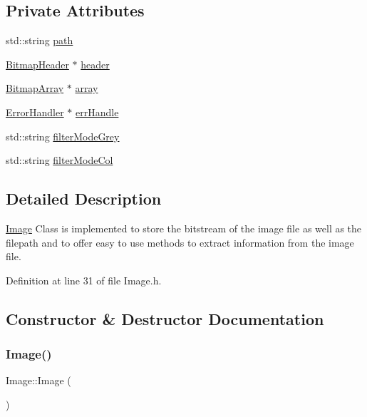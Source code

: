 \subsection*{Private Attributes}
\begin{DoxyCompactItemize}
\item 
std\+::string \mbox{\hyperlink{classImage_aec8a33f176362d146da8c058798ebbff}{path}}
\item 
\mbox{\hyperlink{classBitmapHeader}{Bitmap\+Header}} $\ast$ \mbox{\hyperlink{classImage_adaf72c2df8979eafb4031dc0384dc49f}{header}}
\item 
\mbox{\hyperlink{classBitmapArray}{Bitmap\+Array}} $\ast$ \mbox{\hyperlink{classImage_a1c18dd7d9eda416d44e7eb408d5b3c38}{array}}
\item 
\mbox{\hyperlink{classErrorHandler}{Error\+Handler}} $\ast$ \mbox{\hyperlink{classImage_a560753c20e67a544be57bba971021375}{err\+Handle}}
\item 
std\+::string \mbox{\hyperlink{classImage_aa05610d5ebee3b0fce0463d2a0b1323f}{filter\+Mode\+Grey}}
\item 
std\+::string \mbox{\hyperlink{classImage_a0b4e4d5994ff72c9f3c99913037c627f}{filter\+Mode\+Col}}
\end{DoxyCompactItemize}


\subsection{Detailed Description}
\mbox{\hyperlink{classImage}{Image}} Class is implemented to store the bitstream of the image file as well as the filepath and to offer easy to use methods to extract information from the image file. 

Definition at line 31 of file Image.\+h.



\subsection{Constructor \& Destructor Documentation}
\mbox{\label{classImage_a58edd1c45b4faeb5f789b0d036d02313}} 
\subsubsection{\texorpdfstring{Image()}{Image()}\hspace{0.1cm}{\footnotesize\ttfamily [1/3]}}
{\footnotesize\ttfamily Image\+::\+Image (\begin{DoxyParamCaption}{ }\end{DoxyParamCaption})}



